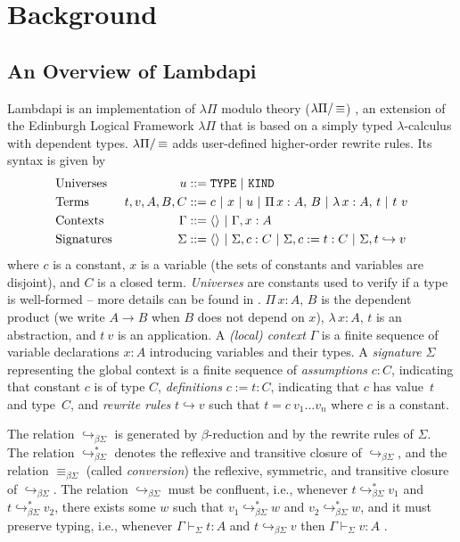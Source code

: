 \section{Background}
\label{sec:background}

\subsection{An Overview of Lambdapi}
\label{ssect:lambdapi-overview}

Lambdapi is an implementation of $\lambda\Pi$ modulo theory ($\lpm$) \cite{lambdapi}, an extension of the Edinburgh Logical Framework $\lambda\Pi$ \cite{lf} that is based on a simply typed $\lambda$-calculus with dependent types. $\lpm$ adds user-defined higher-order rewrite rules. Its syntax is given by
%
\begin{align*}
&\text{Universes}  &u &::= \tt{TYPE} ~|~ \tt{KIND} \\
&\text{Terms}   &t,v, A,B,C &::= c ~|~ x ~|~ u ~|~ \Pi\,x : A,\,B~|~ \lambda\,x : A,\,t ~|~t~v \\
&\text{Contexts}   &\Gamma &::= \langle \rangle ~|~ \Gamma, x : A \\
&\text{Signatures}  &\Sigma &::= \langle \rangle ~|~ \Sigma, c : C ~|~ \Sigma, c := t : C ~|~ \Sigma, t \hookrightarrow v 
\end{align*}
%
where $c$ is a constant, $x$ is a variable  (the sets of constants and variables are disjoint), and $C$ is a closed term. \emph{Universes} are constants used to verify if a type is well-formed -- more details can be found in \cite[\S 2.1]{lf}. $\Pi\,x : A,\,B$ is the dependent product (we write $A \rightarrow B$ when $B$ does not depend on $x$), $\lambda\,x : A,\,t$ is an abstraction, and  $t~v$ is an application. A \emph{(local) context} $\Gamma$ is a finite sequence of variable declarations $x:A$ introducing variables and their types.
A \emph{signature} $\Sigma$ representing the global context is a finite sequence of \emph{assumptions} $c : C$, indicating that constant $c$ is of type $C$, \emph{definitions} $c := t : C$, indicating that $c$ has value~$t$ and type~$C$, and \emph{rewrite rules} $t \hookrightarrow v$ such that $t = c~v_1 \dots v_n$ where $c$ is a constant.

The relation $\hookrightarrow_{\beta\Sigma}$ is generated by $\beta$-reduction and by the rewrite rules of $\Sigma$. The relation $\hookrightarrow_{\beta\Sigma}^*$ denotes the reflexive and transitive closure of $\hookrightarrow_{\beta\Sigma}$, and the relation $\equiv_{\beta\Sigma}$ (called \emph{conversion}) the reflexive, symmetric, and transitive closure of $\hookrightarrow_{\beta\Sigma}$. 
The relation $\hookrightarrow_{\beta\Sigma}$ must be confluent, i.e.,
whenever $t \hookrightarrow_{\beta\Sigma}^* v_1$ and $t \hookrightarrow_{\beta\Sigma}^* v_2$, there exists some $w$ such that $v_1 \hookrightarrow_{\beta\Sigma}^* w$ and $v_2 \hookrightarrow_{\beta\Sigma}^* w$, and it must preserve typing, i.e., 
whenever $\Gamma \vdash_\Sigma t: A$ and $t \hookrightarrow_{\beta\Sigma} v$ then $\Gamma \vdash_\Sigma v: A$ \cite{blanqui:LIPIcs.FSCD.2020.13}.

